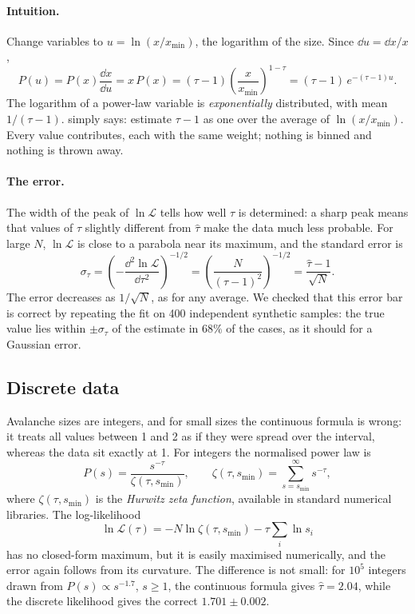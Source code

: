 \paragraph{Intuition.} Change variables to $u = \ln(x/x_{\min})$, the logarithm of the size. Since $\dd u = \dd x/x$,
\[
  P(u) = P(x)\frac{\dd x}{\dd u} = x\,P(x) = (\tau-1)\left(\frac{x}{x_{\min}}\right)^{1-\tau} = (\tau-1)\,e^{-(\tau-1)u}.
\]
The logarithm of a power-law variable is \emph{exponentially} distributed, with mean $1/(\tau-1)$.  simply
says: estimate $\tau-1$ as one over the average of $\ln(x/x_{\min})$. Every value contributes, each with the same weight;
nothing is binned and nothing is thrown away.

\paragraph{The error.} The width of the peak of $\ln\mathcal L$ tells how well $\tau$ is determined: a sharp peak means
that values of $\tau$ slightly different from $\hat\tau$ make the data much less probable. For large $N$, $\ln\mathcal L$
is close to a parabola near its maximum, and the standard error is
\begin{equation}
  \sigma_\tau = \left(-\frac{\dd^2\ln\mathcal L}{\dd\tau^2}\right)^{-1/2} = \left(\frac{N}{(\tau-1)^2}\right)^{-1/2}
  = \frac{\hat\tau-1}{\sqrt N} .
  \label{eq:mle-err}
\end{equation}
The error decreases as $1/\sqrt N$, as for any average. We checked that this error bar is correct by repeating the fit
on 400 independent synthetic samples: the true value lies within $\pm\sigma_\tau$ of the estimate in $68\%$ of the cases,
as it should for a Gaussian error.

\subsection{Discrete data}

Avalanche sizes are integers, and for small sizes the continuous formula is wrong: it treats all values between 1 and 2 as
if they were spread over the interval, whereas the data sit exactly at 1. For integers the normalised power law is
\begin{equation}
  P(s) = \frac{s^{-\tau}}{\zeta(\tau, s_{\min})}, \qquad
  \zeta(\tau, s_{\min}) = \sum_{s=s_{\min}}^{\infty} s^{-\tau},
\end{equation}
where $\zeta(\tau, s_{\min})$ is the \emph{Hurwitz zeta function}, available in standard numerical libraries. The
log-likelihood
\begin{equation}
  \ln\mathcal L(\tau) = -N\ln\zeta(\tau,s_{\min}) - \tau\sum_i\ln s_i
\end{equation}
has no closed-form maximum, but it is easily maximised numerically, and the error again follows from its curvature. The
difference is not small: for $10^5$ integers drawn from $P(s)\propto s^{-1.7}$, $s\ge1$, the continuous formula gives
$\hat\tau=2.04$, while the discrete likelihood gives the correct $1.701\pm0.002$.

